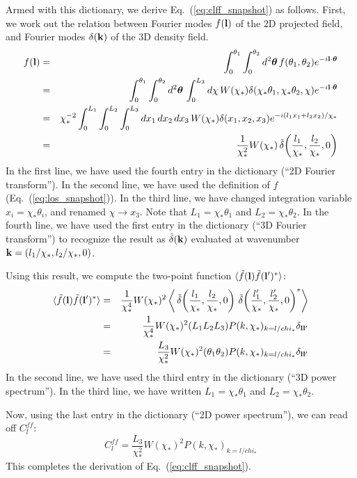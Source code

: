 \documentclass[aps,prd,superscriptaddress,groupedaddress,nofootinbib,nobibnotes]{revtex4}
\newcommand{\be}{\begin{equation}}
\newcommand{\ee}{\end{equation}}
\newcommand{\ba}{\begin{eqnarray}}
\newcommand{\ea}{\end{eqnarray}}
\newcommand{\nn}{\nonumber}
\def\k{{\bf k}}
\def\l{{\bf l}}
\def\th{{\bm{\theta}}}
\def\tdelta{\tilde\delta}
\def\tf{\tilde f}
\begin{document}
Armed with this dictionary, we derive Eq.~(\ref{eq:clff_snapshot}) as follows.
First, we work out the relation between Fourier modes $f(\l)$ of the 2D projected field,
and Fourier modes $\delta(\k)$ of the 3D density field.
\ba
f(\l)
  &=& \int_0^{\theta_1} \int_0^{\theta_2} d^2\th \, f(\theta_1,\theta_2) e^{-i\l\cdot\th} \nn \\
  &=& \int_0^{\theta_1} \int_0^{\theta_2} d^2\th \, \int_0^{L_3} d\chi \, W(\chi_*) \delta(\chi_*\theta_1, \chi_*\theta_2, \chi) e^{-i\l\cdot\th} \nn \\
  &=& \chi_*^{-2} \int_0^{L_1} \int_0^{L_2} \int_0^{L_3} dx_1 \, dx_2 \, dx_3 \, W(\chi_*) \delta(x_1, x_2, x_3) e^{-i(l_1 x_1 + l_2 x_2) / \chi_*} \nn \\
  &=& \frac{1}{\chi_*^2} W(\chi_*) \, \tdelta\!\left( \frac{l_1}{\chi_*}, \frac{l_2}{\chi_*}, 0 \right) 
\ea
In the first line, we have used the fourth entry in the dictionary (``2D Fourier transform'').
In the second line, we have used the definition of $f$ (Eq.~(\ref{eq:los_snapshot})).
In the third line, we have changed integration variable $x_i = \chi_* \theta_i$, and renamed $\chi \rightarrow x_3$.
Note that $L_1 = \chi_* \theta_1$ and $L_2 = \chi_* \theta_2$.
In the fourth line, we have used the first entry in the dictionary (``3D Fourier transform'')
to recognize the result as $\tdelta(\k)$ evaluated at wavenumber $\k = (l_1/\chi_*, l_2/\chi_*, 0)$.

Using this result, we compute the two-point function $\langle \tf(\l) \tf(\l')^* \rangle$:
\ba
\langle \tf(\l) \tf(\l')^* \rangle
  &=& \frac{1}{\chi_*^4} W(\chi_*)^2 \left\langle 
      \, \tdelta\!\left( \frac{l_1}{\chi_*}, \frac{l_2}{\chi_*}, 0 \right) 
      \, \tdelta\!\left( \frac{l_1'}{\chi_*}, \frac{l_2'}{\chi_*}, 0 \right)^*
   \right\rangle \nn \\
  &=& \frac{1}{\chi_*^4} W(\chi_*)^2 (L_1L_2L_3) P(k,\chi_*)_{k=l/chi_*} \delta_{\l\l'} \nn \\
  &=& \frac{L_3}{\chi_*^2} W(\chi_*)^2 (\theta_1\theta_2) P(k,\chi_*)_{k=l/chi_*} \delta_{\l\l'} 
\ea
In the second line, we have used the third entry in the dictionary (``3D power spectrum'').
In the third line, we have written $L_1 = \chi_* \theta_1$ and $L_2 = \chi_* \theta_2$.

Now, using the last entry in the dictionary (``2D power spectrum''), we can read off $C_l^{ff}$:
\be
C_l^{ff} = \frac{L_3}{\chi_*^2} W(\chi_*)^2 P(k,\chi_*)_{k=l/chi_*}
\ee
This completes the derivation of Eq.~(\ref{eq:clff_snapshot}).
\end{document}
